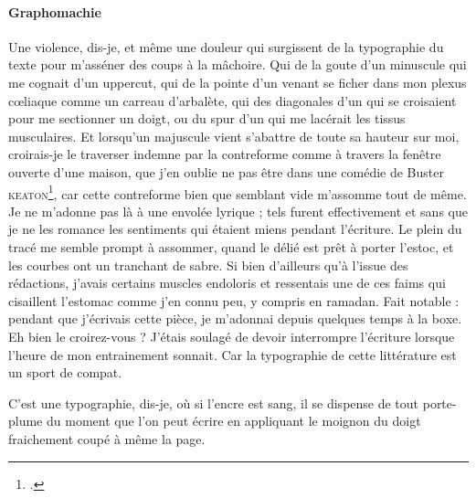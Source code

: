 \paragraph{Graphomachie}
Une violence, dis-je, et même une douleur qui surgissent de la typographie du texte pour m’asséner des coups à la mâchoire. Qui de la goute d’un  minuscule qui me cognait d’un uppercut, qui de la pointe d’un  venant se ficher dans mon plexus cœliaque comme un carreau d’arbalète, qui des diagonales d’un  qui se croisaient pour me sectionner un doigt, ou du spur d’un  qui me lacérait les tissus musculaires. Et lorsqu’un  majuscule vient s’abattre de toute sa hauteur sur moi, croirais-je le traverser indemne par la contreforme comme à travers la fenêtre ouverte d’une maison, que j’en oublie ne pas être dans une comédie de Buster \textsc{keaton}\footcite{keaton1928SteamboatBill}, car cette contreforme bien que semblant vide m’assomme tout de même. Je ne m’adonne pas là à une envolée lyrique ; tels furent effectivement et sans que je ne les romance les sentiments qui étaient miens pendant l’écriture. Le plein du tracé me semble prompt à assommer, quand le délié est prêt à porter l’estoc, et les courbes ont un tranchant de sabre.  Si bien d’ailleurs qu’à l’issue des rédactions, j’avais certains muscles endoloris et ressentais une de ces faims qui cisaillent l’estomac comme j’en connu peu, y compris en ramadan. Fait notable : pendant que j’écrivais cette pièce, je m’adonnai depuis quelques temps à la boxe. Eh bien le croirez-vous ? J’étais soulagé de devoir interrompre l’écriture lorsque l’heure de mon entrainement sonnait. Car la typographie de cette littérature est un sport de compat.

C’est une typographie, dis-je, où si l’encre est sang, il se dispense de tout porte-plume du moment que l’on peut écrire en appliquant le moignon du doigt fraichement coupé  à même la page.


